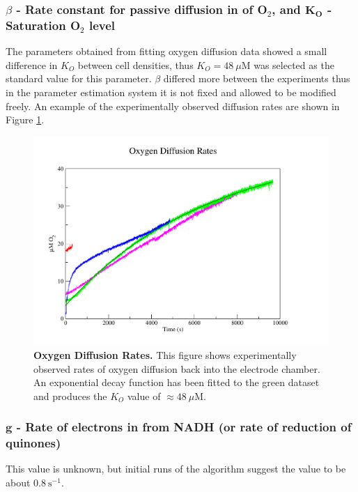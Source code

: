\subsubsection*{$\beta$ {\bf- Rate constant for passive diffusion in of O$_{\textrm{2}}$}, and $\mathbf{K_O}$ {\bf- Saturation O$_{\textrm{2}}$ level}}
The parameters obtained from fitting oxygen diffusion data showed a small difference in $K_O$ between cell densities, thus $K_O = 48~\mu \mathrm{M}$ was selected as the standard value for this parameter. $\beta$ differed more between the experiments thus in the parameter estimation system it is not fixed and allowed to be modified freely. An example of the experimentally observed diffusion rates are shown in Figure \ref{fig:o2rec}.
\begin{figure}[tbp]
 \centering
 \includegraphics[width=14cm, trim=2cm 1cm 4cm 1cm]{./04-model/data/o2rec.pdf}
 \caption[Oxygen Diffusion Rates]{{\bf Oxygen Diffusion Rates.} This figure shows experimentally observed rates of oxygen diffusion back into the electrode chamber. An exponential decay function has been fitted to the green dataset and produces the $K_O$ value of $\approx 48~\mu \mathrm{M}$.
 \label{fig:o2rec}}
\end{figure}


\subsubsection*{$\mathbf{g}$ {\bf- Rate of electrons in from NADH (or rate of reduction of quinones)}}
This value is unknown, but initial runs of the algorithm suggest the value to be about $0.8~\mathrm{s}^{-1}$.

